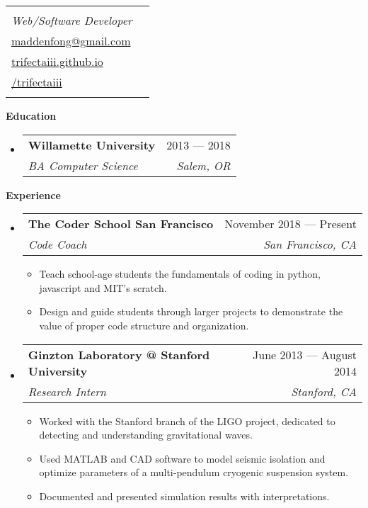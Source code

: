 \documentclass[letterpaper,12pt]{article}[leftmargin=*]
\makeatletter
\def \fullname {Dakota Madden-Fong}
\def \subtitle {Web/Software Developer}
\def \linkedinicon {\faLinkedin}
\def \linkedinlink {https://www.linkedin.com/in/dakota-madden-fong/}
\def \linkedintext {/dakota-madden-fong}
\def \phoneicon {\faPhone}
\def \phonetext {+1-415-810-0334}
\def \emailicon {\faEnvelope}
\def \emaillink {mailto:maddenfong@gmail.com}
\def \emailtext {maddenfong@gmail.com}
\def \githubicon {\faGithub}
\def \githublink {https://github.com/trifectaiii}
\def \githubtext {/trifectaiii}
\def \websiteicon {\faGlobe}
\def \websitelink {https://trifectaiii.github.io/}
\def \websitetext {trifectaiii.github.io}
\def \headertype {\singlecol} %
\def \entryspacing {-0pt}
\def \linkedin {\linkedinicon \hspace{3pt}\href{\linkedinlink}{\linkedintext}}
\def \phone {\phoneicon \hspace{3pt}{ \phonetext}}
\def \email {\emailicon \hspace{3pt}\href{\emaillink}{\emailtext}}
\def \github {\githubicon \hspace{3pt}\href{\githublink}{\githubtext}}
\def \website {\websiteicon \hspace{3pt}\href{\websitelink}{\websitetext}}
\renewcommand{\section}[2]{\vspace{5pt}
  \colorbox{secondary}{\color{white}\raggedbottom\normalsize\textbf{{#1}{\hspace{7pt}#2}}}
}
\newcommand{\resumeEntryStart}{\begin{itemize}[leftmargin=2.5mm]}
\newcommand{\resumeEntryEnd}{\end{itemize}\vspace{\entryspacing}}
\newcommand{\resumeItemListStart}{\begin{itemize}[leftmargin=4.5mm]}
\newcommand{\resumeItemListEnd}{\end{itemize}}
\newcommand{\resumeItem}[1]{
  \item{%
    {#1 \vspace{-2pt}}
  }
}
\newcommand{\resumeEntryTSDL}[4]{
  \vspace{-1pt}\item[]
    \begin{tabular*}{0.97\textwidth}{l@{\extracolsep{\fill}}r}
      \textbf{\color{primary}#1} & {\firabook\color{accent}\small#2} \\
      \textit{\color{accent}\small#3} & \textit{\color{accent}\small#4} \\
    \end{tabular*}\vspace{-6pt}
}
\newcommand{\doublecol}[6]{
  \begin{tabular*}{\textwidth}{l@{\extracolsep{\fill}}r}
    {
      \begin{tabular}[c]{l}
        \fontsize{35}{45}\selectfont{\color{primary}{{\textbf{\fullname}}}} \\
        {\textit{\subtitle}} %
      \end{tabular}
    } & {
      \begin{tabular}[c]{l@{\hspace{1.5em}}l}
        {\small#4} & {\small#1} \\
        {\small#5} & {\small#2} \\
        {\small#6} & {\small#3}
      \end{tabular}
    }
  \end{tabular*}
}
\newcommand{\singlecol}[4]{%
  \begin{tabular*}{\textwidth}{l@{\extracolsep{\fill}}r}
    {
      \begin{tabular}[b]{l}
        \fontsize{35}{45}\selectfont{\color{primary}{{\textbf{\fullname}}}} \\
        {\textit{\subtitle}} %
      \end{tabular}
    } & {
      \begin{tabular}[c]{l}
        {\small#1} \\
        {\small#2} \\
        {\small#3} \\
        {\small#4} \\
      \end{tabular}
    }
  \end{tabular*}
}
\makeatother
\begin{document}


\headertype{\phone}{\email}{\website}{\github}{}{} %
\vspace{-10pt} %

\section{\faGraduationCap}{Education}

  \resumeEntryStart
    \resumeEntryTSDL
      {Willamette University}{2013 --- 2018}
      {BA Computer Science}{Salem, OR}
  \resumeEntryEnd

\section{\faPieChart}{Experience}

  \resumeEntryStart
    \resumeEntryTSDL
      {The Coder School San Francisco}{November 2018 --- Present}
      {Code Coach}{San Francisco, CA}
    \resumeItemListStart
      \resumeItem {Teach school-age students the fundamentals of coding in python, javascript and MIT's scratch.}
      \resumeItem {Design and guide students through larger projects to demonstrate the value of proper code structure and organization.}
    \resumeItemListEnd
  \resumeEntryEnd

  \resumeEntryStart
    \resumeEntryTSDL
      {Ginzton Laboratory @ Stanford University}{June 2013 --- August 2014}
      {Research Intern}{Stanford, CA}
    \resumeItemListStart
      \resumeItem {Worked with the Stanford branch of the LIGO project, dedicated to detecting and understanding gravitational waves.}
      \resumeItem {Used MATLAB and CAD software to model seismic isolation and optimize parameters
of a multi-pendulum cryogenic suspension system.}
      \resumeItem {Documented and presented simulation results with interpretations.}
    \resumeItemListEnd
  \resumeEntryEnd
\end{document}
